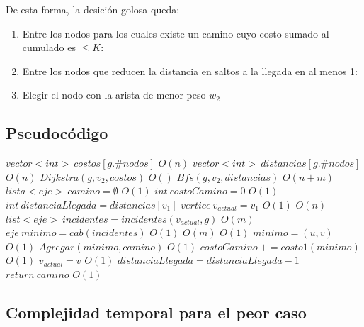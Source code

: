 De esta forma, la desici\'on golosa queda:

\begin{enumerate}
\item Entre los nodos para los cuales existe un camino cuyo costo sumado al cumulado es $\leq K$:
\item Entre los nodos que reducen la distancia en saltos a la llegada en al menos 1:
\item Elegir el nodo con la arista de menor peso $w_2$
\end{enumerate}

\subsection{Pseudoc\'odigo}


\begin{algorithmic}


\State $vector<int> \: costos[g.\#nodos]$
\Comment $ O(n) $
\State $vector<int> \: distancias[g.\#nodos]$
\Comment $ O(n) $
\State $ Dijkstra( g, v_2, costos) $
\Comment $ O() $
\State $ Bfs( g, v_2, distancias) $
\Comment $ O(n+m) $
\State $lista<eje> \: camino= \emptyset$
\Comment $ O(1) $
\State $ int \: costoCamino = 0 $
\Comment $ O(1) $
\State $ int \: distanciaLlegada = distancias[v_1]$
\State $ vertice \: v_{actual} = v_1 $
\Comment $ O(1) $
\Comment $ O(n) $
	\State $ list<eje> \: incidentes = incidentes(v_{actual}, g) $
	\Comment $ O(m) $
	\State $ eje \:	 minimo = cab(incidentes) $
	\Comment $ O(1)$
	\Comment $ O(m) $
		\Comment $ O(1) $
			\State $ minimo = (u,v) $
			\Comment $ O(1) $
		\EndIf
	\EndFor
	\State $ Agregar(minimo, camino) $
	\Comment $ O(1) $
	\State $ costoCamino \: += costo1(minimo) $
	\Comment $ O(1) $
	\State $ v_{actual} = v $
	\Comment $ O(1) $
	\State $distanciaLlegada = distanciaLlegada - 1 $
\EndWhile
\State $ return \: camino $
\Comment $ O(1) $

\EndProcedure

\end{algorithmic}

\subsection{Complejidad temporal para el peor caso}


